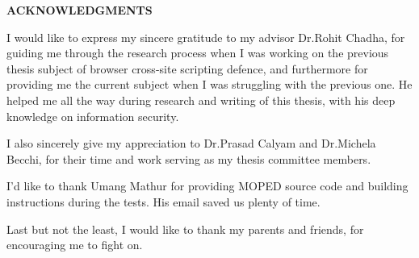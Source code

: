 \newpage
{}
\setcounter{page}{2}

\centerline{\bf \large ACKNOWLEDGMENTS}
\vskip 10mm %
I would like to express my sincere gratitude to my advisor Dr.Rohit Chadha, for guiding me through the research process when I was working on the previous thesis subject of browser cross-site scripting defence, and furthermore for providing me the current subject when I was struggling with the previous one. He helped me all the way during research and writing of this thesis, with his deep knowledge on information security.

I also sincerely give my appreciation to Dr.Prasad Calyam and Dr.Michela Becchi, for their time and work serving as my thesis committee members.

I'd like to thank Umang Mathur for providing MOPED source code and building instructions during the tests. His email saved us plenty of time. 

Last but not the least, I would like to thank my parents and friends, for encouraging me to fight on.
